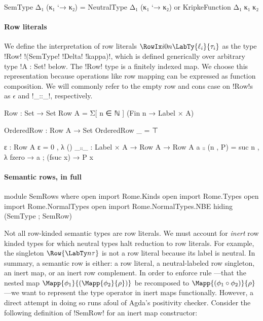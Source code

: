 \begin{AgdaAlign}
\begin{code}
    SemType Δ₁ (κ₁ `→ κ₂) = 
        NeutralType Δ₁ (κ₁ `→ κ₂) 
     or KripkeFunction Δ₁ κ₁ κ₂
\end{code} 


\paragraph{Row literals} We define the interpretation of row literals ${\RowIx i 0 n {\LabTy {\ell_i} {\tau_i}}}$ as the type !Row! !(SemType! !Delta! !kappa)!, which is defined generically over arbitrary type !A : Set! below. The !Row! type is a finitely indexed map. We choose this representation because operations like row mapping can be expressed as function composition. We will commonly refer to the empty row and cons case on !Row!s as $\epsilon$ and !_::_!, respectively.

\begin{code}
  Row : Set → Set 
  Row A = Σ[ n ∈ ℕ ] (Fin n → Label × A)
\end{code}
\begin{code}[hide]
  OrderedRow : Row A → Set
  OrderedRow _ = ⊤
\end{code}


\begin{code}[hide]
  ε : Row A 
  ε = 0 , λ ()
  _⨾⨾_ :  Label × A → Row A → Row A
  a ⨾⨾ (n , P) = suc n , λ { fzero → a 
                          ; (fsuc x) → P x }
\end{code}


\paragraph{Semantic rows, in full}
\begin{code}[hide]
module SemRows where
  open import Rome.Kinds
  open import Rome.Types
  open import Rome.NormalTypes
  open import Rome.NormalTypes.NBE hiding (SemType ; SemRow)
\end{code}
\begin{code}[hide]
\end{code}

Not all row-kinded semantic types are row literals. We must account for \emph{inert} row kinded types for which neutral types halt reduction to row literals. For example, the singleton $\Row {\LabTy n \tau}$ is not a row literal because its label is neutral. In summary, a semantic row is either: a row literal, a neutral-labeled row singleton, an inert map, or an inert row complement.  In order to enforce rule ---that the nested map $\Mapp{\phi_{1}}{(\Mapp{\phi_{2}}{\rho})}$ be recomposed to $\Mapp{(\phi_{1} \circ \phi_{2})}{\rho}$---we want to represent the type operator in inert maps functionally. However, a direct attempt in doing so runs afoul of Agda's positivity checker. Consider the following definition of !SemRow! for an inert map constructor:


\end{AgdaAlign}
